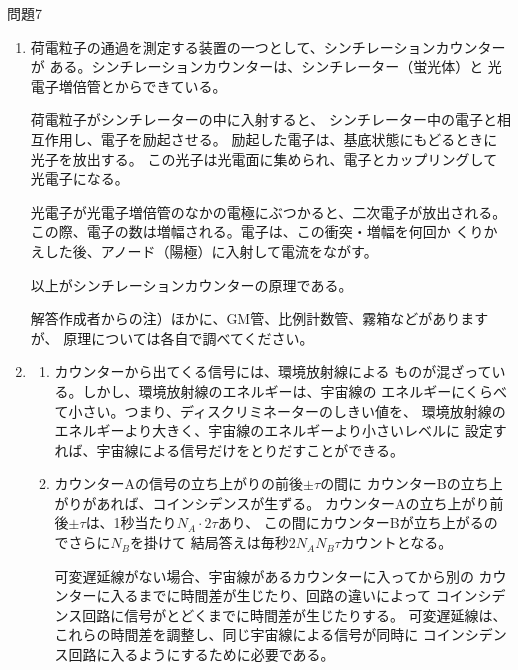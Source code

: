\documentclass[fleqn]{jbook}
\begin{document}
\begin{answer}{問題7}{}
\begin{enumerate}
\item 
荷電粒子の通過を測定する装置の一つとして、シンチレーションカウンターが
ある。シンチレーションカウンターは、シンチレーター（蛍光体）と
光電子増倍管とからできている。

荷電粒子がシンチレーターの中に入射すると、
シンチレーター中の電子と相互作用し、電子を励起させる。
励起した電子は、基底状態にもどるときに光子を放出する。
この光子は光電面に集められ、電子とカップリングして光電子になる。

光電子が光電子増倍管のなかの電極にぶつかると、二次電子が放出される。
この際、電子の数は増幅される。電子は、この衝突・増幅を何回か
くりかえした後、アノード（陽極）に入射して電流をながす。

以上がシンチレーションカウンターの原理である。

解答作成者からの注）ほかに、GM管、比例計数管、霧箱などがありますが、
原理については各自で調べてください。

\item
\begin{enumerate}
\item カウンターから出てくる信号には、環境放射線による
ものが混ざっている。しかし、環境放射線のエネルギーは、宇宙線の
エネルギーにくらべて小さい。つまり、ディスクリミネーターのしきい値を、
環境放射線のエネルギーより大きく、宇宙線のエネルギーより小さいレベルに
設定すれば、宇宙線による信号だけをとりだすことができる。\\

\item
カウンターAの信号の立ち上がりの前後$\pm\tau$の間に
カウンターBの立ち上がりがあれば、コインシデンスが生ずる。
カウンターAの立ち上がり前後$\pm\tau$は、1秒当たり$N_A\cdot 2\tau$あり、
この間にカウンターBが立ち上がるのでさらに$N_B$を掛けて
結局答えは毎秒$2N_AN_B\tau$カウントとなる。


可変遅延線がない場合、宇宙線があるカウンターに入ってから別の
カウンターに入るまでに時間差が生じたり、回路の違いによって
コインシデンス回路に信号がとどくまでに時間差が生じたりする。
可変遅延線は、これらの時間差を調整し、同じ宇宙線による信号が同時に
コインシデンス回路に入るようにするために必要である。


\end{enumerate}
\end{enumerate}
\end{answer}
\end{document}
